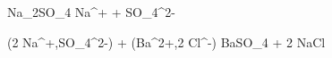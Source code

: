 \documentclass{article}
\begin{document}
	
	\begin{chemmath}
		Na_{2}SO_{4}
		Na^{+} + SO_{4}^{2-}
	\end{chemmath}
	
	\begin{chemmath}
		(2 Na^{+},SO_{4}^{2-}) + (Ba^{2+},2 Cl^{-})
		\reactrarrow{0pt}{1cm}{}{}
		BaSO_{4} + 2 NaCl
	\end{chemmath}
	
\end{document}
